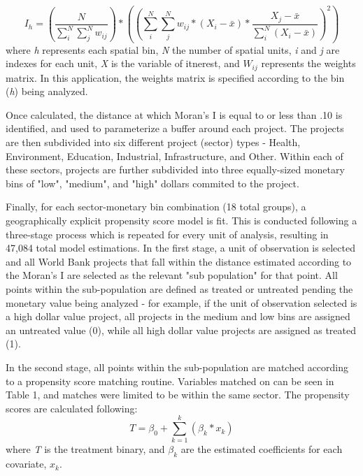 \documentclass{article}\usepackage[]{graphicx}\usepackage[]{color}
\newenvironment{knitrout}{}{}  %
\begin{document}
\begin{knitrout}
\begin{equation}
I_h = (\frac{N}{\sum_{i}^{N}\sum_{j}^{N}w_{ij}}) * ((\sum_{i}^{N}\sum_{j}^{N}w_{ij} * (X_{i}-\bar{x}) * \frac{X_{j} - \bar{x}}{\sum_{i}^{N}(X_{i}-\bar{x})})^{2})
\end{equation}
where \textit{h} represents each spatial bin, \textit{N} the number of spatial units, \textit{i} and \textit{j} are indexes for each unit, \textit{X} is the variable of itnerest, and \begin{math}W_{ij}\end{math} represents the weights matrix.  
In this application, the weights matrix is specified according to the bin (\textit{h}) being analyzed.  
\par
Once calculated, the distance at which Moran's I is equal to or less than .10 is identified, and used to parameterize a buffer around each project.  
The projects are then subdivided into six different project (sector) types - Health, Environment, Education, Industrial, Infrastructure, and Other.  
Within each of these sectors, projects are further subdivided into three equally-sized monetary bins of "low", "medium", and "high" dollars commited to the project.
\par
Finally, for each sector-monetary bin combination (18 total groups), a geographically explicit propensity score model is fit.  
This is conducted following a three-stage process which is repeated for every unit of analysis, resulting in 47,084 total model estimations.
In the first stage, a unit of observation is selected and all World Bank projects that fall within the distance estimated according to the Moran's I are selected as the relevant "sub population" for that point.
All points within the sub-population are defined as treated or untreated pending the monetary value being analyzed - for example, if the unit of observation selected is a high dollar value project, all projects in the medium and low bins are assigned an untreated value (0), while all high dollar value projects are assigned as treated (1).
\par
In the second stage, all points within the sub-population are matched according to a propensity score matching routine.  Variables matched on can be seen in Table 1, and matches were limited to be within the same sector. The propensity scores are calculated following:
\begin{equation}
T = \beta_{0} + \sum_{k=1}^{k}(\beta_{k}*x_{k})
\end{equation}
where \textit{T} is the treatment binary, and \begin{math}\beta_{k}\end{math} are the estimated coefficients for each covariate, \begin{math}x_{k}\end{math}.  

\end{knitrout}
\end{document}
